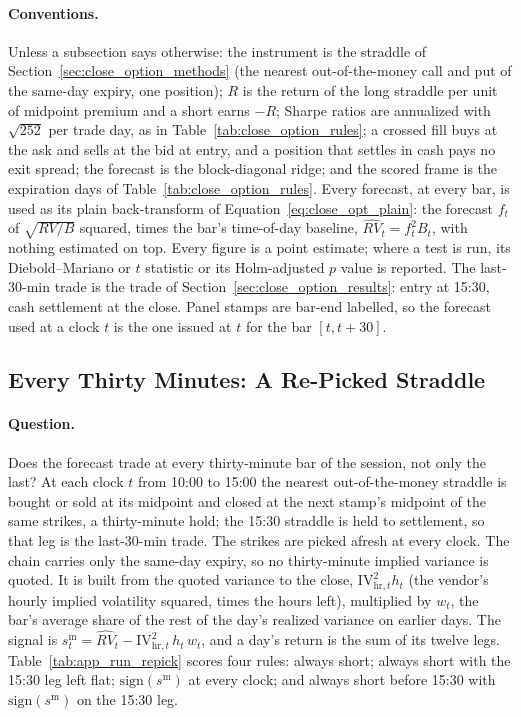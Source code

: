 \paragraph{Conventions.} Unless a subsection says otherwise: the instrument is
the straddle of Section~\ref{sec:close_option_methods} (the nearest
out-of-the-money call and put of the same-day expiry, one position); $R$ is the
return of the long straddle per unit of midpoint premium and a short earns
$-R$; Sharpe ratios are annualized with $\sqrt{252}$ per trade day, as in
Table~\ref{tab:close_option_rules}; a crossed fill buys at the ask and sells at
the bid at entry, and a position that settles in cash pays no exit spread; the
forecast is the block-diagonal ridge; and the scored frame is the
\runappHcNdays{} expiration days of Table~\ref{tab:close_option_rules}. Every
forecast, at every bar, is used as its plain back-transform of
Equation~\eqref{eq:close_opt_plain}: the forecast $f_t$ of $\sqrt{RV/B}$
squared, times the bar's time-of-day baseline, $\widehat{RV}_t=f_t^2B_t$, with
nothing estimated on top. Every figure is a point estimate; where a test is
run, its Diebold--Mariano or $t$ statistic or its Holm-adjusted $p$ value is
reported. The
last-30-min trade is the trade of Section~\ref{sec:close_option_results}: entry
at 15:30, cash settlement at the close. Panel stamps are bar-end labelled, so
the forecast used at a clock $t$ is the one issued at $t$ for the bar
$[t, t+30]$.

\subsection{Every Thirty Minutes: A Re-Picked Straddle}
\label{sec:app_run_repick}

\paragraph{Question.} Does the forecast trade at every thirty-minute bar of the
session, not only the last? At each clock $t$ from 10:00 to 15:00 the nearest
out-of-the-money straddle is bought or sold at its midpoint and closed at the
next stamp's midpoint of the same strikes, a thirty-minute hold; the 15:30
straddle is held to settlement, so that leg is the last-30-min trade. The
strikes are picked afresh at every clock. The chain carries only the same-day
expiry, so no thirty-minute implied variance is quoted. It is built from the
quoted variance to the close, $\mathrm{IV}^2_{\mathrm{hr},t}h_t$ (the vendor's
hourly implied volatility squared, times the hours left), multiplied by $w_t$,
the bar's average share of the rest of the day's realized variance on earlier
days. The signal is
$s^{\mathrm m}_t=\widehat{RV}_t-\mathrm{IV}^2_{\mathrm{hr},t}\,h_t\,w_t$, and a
day's return is the sum of its twelve legs.
Table~\ref{tab:app_run_repick} scores four rules: always short; always short
with the 15:30 leg left flat; $\mathrm{sign}(s^{\mathrm m})$ at every clock;
and always short before 15:30 with $\mathrm{sign}(s^{\mathrm m})$ on the 15:30
leg.

